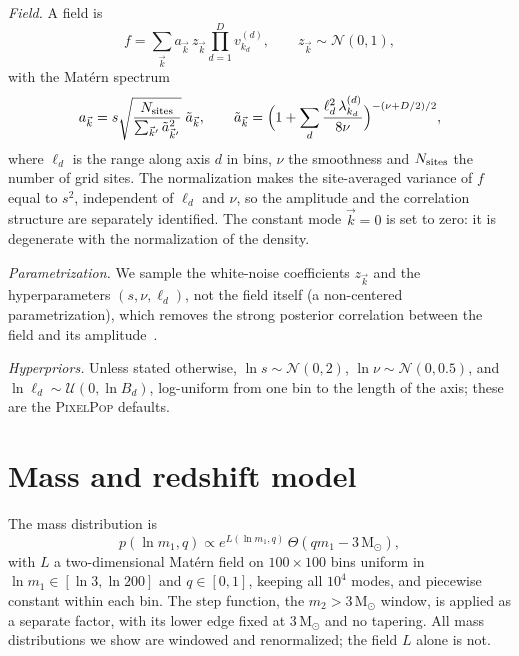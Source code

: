 \documentclass[%
 reprint,
 amsmath,amssymb,
 aps,
 prl,
 nofootinbib,nobibnotes,
 floatfix,
]{revtex4-2}
\newcommand{\Msun}{\ensuremath{\mathrm{M}_{\odot}}}
\newcommand{\PixelPop}{\textsc{PixelPop}\xspace}
\begin{document}
\textit{Field.} A field is
\begin{equation}
    f = \sum_{\vec{k}} a_{\vec{k}}\, z_{\vec{k}} \prod_{d=1}^{D} v^{(d)}_{k_d}, \qquad z_{\vec{k}} \sim \mathcal{N}(0, 1),
\end{equation}
with the Mat\'ern spectrum
\begin{equation}
    a_{\vec{k}} = s \sqrt{\frac{N_{\rm sites}}{\sum_{\vec{k}'} \tilde{a}_{\vec{k}'}^2}}\; \tilde{a}_{\vec{k}}, \qquad
    \tilde{a}_{\vec{k}} = \Big(1 + \sum_{d} \frac{\ell_d^2\, \lambda^{(d)}_{k_d}}{8\nu}\Big)^{-(\nu + D/2)/2},
\end{equation}
where $\ell_d$ is the range along axis $d$ in bins, $\nu$ the smoothness and $N_{\rm sites}$ the number of grid sites. The normalization makes the site-averaged variance of $f$ equal to $s^2$, independent of $\ell_d$ and $\nu$, so the amplitude and the correlation structure are separately identified. The constant mode $\vec{k} = 0$ is set to zero: it is degenerate with the normalization of the density.

\textit{Parametrization.} We sample the white-noise coefficients $z_{\vec{k}}$ and the hyperparameters $(s, \nu, \ell_d)$, not the field itself (a non-centered parametrization), which removes the strong posterior correlation between the field and its amplitude~\cite{Papaspiliopoulos:2007abc, Betancourt:2017ebh}.

\textit{Hyperpriors.} Unless stated otherwise, $\ln s \sim \mathcal{N}(0, 2)$, $\ln \nu \sim \mathcal{N}(0, 0.5)$, and $\ln \ell_d \sim \mathcal{U}(0, \ln B_d)$, log-uniform from one bin to the length of the axis; these are the \PixelPop defaults.

\section{Mass and redshift model}
\label{sm: mass model}

The mass distribution is
\begin{equation}
    p(\ln m_1, q) \propto e^{L(\ln m_1, q)}\, \Theta(q m_1 - 3\,\Msun),
\end{equation}
with $L$ a two-dimensional Mat\'ern field on $100 \times 100$ bins uniform in $\ln m_1 \in [\ln 3, \ln 200]$ and $q \in [0, 1]$, keeping all $10^4$ modes, and piecewise constant within each bin. The step function, the $m_2 > 3\,\Msun$ window, is applied as a separate factor, with its lower edge fixed at $3\,\Msun$ and no tapering. All mass distributions we show are windowed and renormalized; the field $L$ alone is not.
\end{document}
